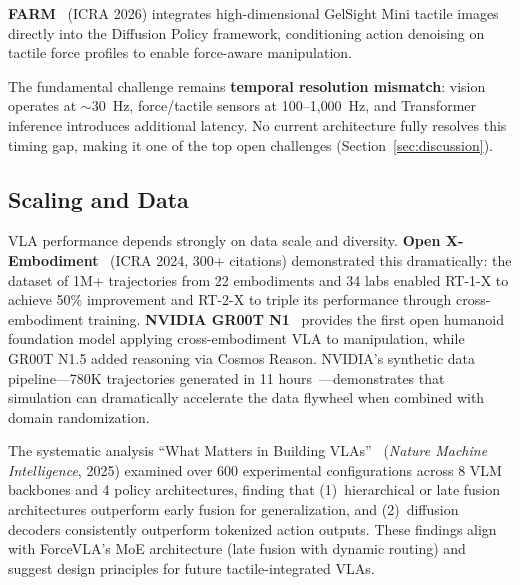 \textbf{FARM}~\cite{helmut2025farm} (ICRA 2026) integrates high-dimensional GelSight Mini tactile images directly into the Diffusion Policy framework, conditioning action denoising on tactile force profiles to enable force-aware manipulation.

The fundamental challenge remains \textbf{temporal resolution mismatch}: vision operates at $\sim$30~Hz, force/tactile sensors at 100--1{,}000~Hz, and Transformer inference introduces additional latency. No current architecture fully resolves this timing gap, making it one of the top open challenges (Section~\ref{sec:discussion}).

\subsection{Scaling and Data}

VLA performance depends strongly on data scale and diversity. \textbf{Open X-Embodiment}~\cite{oxe2024} (ICRA 2024, 300+ citations) demonstrated this dramatically: the dataset of 1M+ trajectories from 22 embodiments and 34 labs enabled RT-1-X to achieve 50\% improvement and RT-2-X to triple its performance through cross-embodiment training. \textbf{NVIDIA GR00T N1}~\cite{nvidia2025groot} provides the first open humanoid foundation model applying cross-embodiment VLA to manipulation, while GR00T N1.5 added reasoning via Cosmos Reason. NVIDIA's synthetic data pipeline---780K trajectories generated in 11 hours~\cite{nvidia2025synthetic}---demonstrates that simulation can dramatically accelerate the data flywheel when combined with domain randomization.

The systematic analysis ``What Matters in Building VLAs''~\cite{various2025whatmatters} (\emph{Nature Machine Intelligence}, 2025) examined over 600 experimental configurations across 8 VLM backbones and 4 policy architectures, finding that (1)~hierarchical or late fusion architectures outperform early fusion for generalization, and (2)~diffusion decoders consistently outperform tokenized action outputs. These findings align with ForceVLA's MoE architecture (late fusion with dynamic routing) and suggest design principles for future tactile-integrated VLAs.
